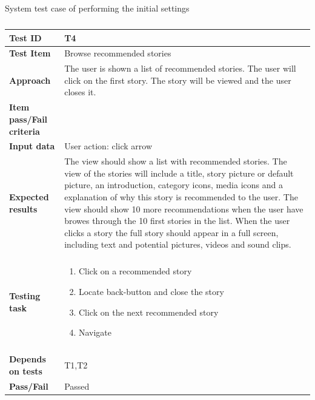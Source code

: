 \begin{appendices}
\begin{table}[H]
	\caption{System test case of performing the initial settings}
	\label{Tab:systemTesting3}
	\end{table}


	\begin{table}[H]
		\centering
		\caption{}
		\begin{tabular}{ | l | l  |}
			\hline
			\hline
			\textbf{Test ID} & T4  \\ \hline
			\textbf{Test Item} & Browse recommended stories \\ \hline
			\textbf{Approach} & \begin{minipage}{5in}The user is shown a list of recommended stories. The user will click on the first story. The story will be viewed and the user closes it. 
			\end{minipage}\\ \hline
			\textbf{Item pass/Fail criteria} &  \\ \hline			
			\textbf{Input data} &  User action: click arrow\\ \hline
			\textbf{Expected results} & \begin{minipage}{5in}The view should show a list with recommended stories. The view of the stories will include a title, story picture or default picture, an introduction, category icons, media icons and a explanation of why this story is recommended to the user.  The view should show 10 more recommendations when the user have browes through the 10 first stories in the list.
			When the user clicks a story the full story should appear in a full screen, including text and potential pictures, videos and sound clips.   \end{minipage}\\ \hline&\\[-3.8ex]
			\textbf{Testing task} & \begin{minipage}{5in}
			\begin{enumerate}[noitemsep]
			\item Click on a recommended story
			\item Locate back-button and close the story
			\item Click on the next recommended story
			\item Navigate 
			\end{enumerate}\end{minipage}
			\\ &\\[-3.8ex]\hline
			\textbf{Depends on tests} & T1,T2 \\ \hline		
			\textbf{Pass/Fail} & Passed \\\hline			
		\end{tabular}
	

\end{table}
\end{appendices}
